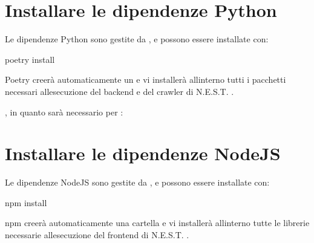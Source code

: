 \documentclass[letterpaper,10pt,italian]{sphinxmanual}
\begin{document}
\section{Installare le dipendenze Python}
\label{\detokenize{guide/installation:installare-le-dipendenze-python}}
\sphinxAtStartPar
Le dipendenze Python sono gestite da , e possono essere installate con:

\begin{sphinxVerbatim}[commandchars=\\\{\}]
poetry install
\end{sphinxVerbatim}

\sphinxAtStartPar
Poetry creerà automaticamente un  e vi installerà all\textquotesingle{}interno tutti
i pacchetti necessari all\textquotesingle{}esecuzione del backend e del crawler di N.E.S.T. .

\sphinxAtStartPar
{}, in quanto sarà necessario per
{\hyperref[\detokenize{guide/installation:creare-un-servizio-systemd-per-il-backend}]{}}:

\begin{sphinxVerbatim}[commandchars=\\\{\}]
\end{sphinxVerbatim}


\section{Installare le dipendenze NodeJS}
\label{\detokenize{guide/installation:installare-le-dipendenze-nodejs}}
\sphinxAtStartPar
Le dipendenze NodeJS sono gestite da , e possono essere installate con:

\begin{sphinxVerbatim}[commandchars=\\\{\}]
npm install
\end{sphinxVerbatim}

\sphinxAtStartPar
npm creerà automaticamente una cartella
 e vi installerà all\textquotesingle{}interno tutte
le librerie necessarie all\textquotesingle{}esecuzione del frontend di N.E.S.T. .
\end{document}
